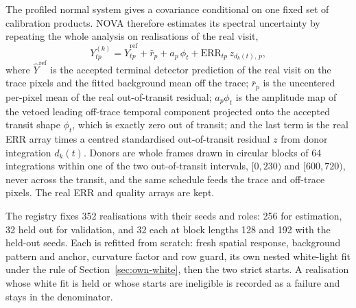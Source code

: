 The profiled normal system gives a covariance conditional on one fixed
set of calibration products. NOVA therefore estimates its spectral
uncertainty by repeating the whole analysis on realisations of the real
visit,
\begin{equation}
 Y^{(k)}_{tp}=\widehat Y^{\mathrm{ref}}_{tp}+\bar r_p+a_p\,\phi_t
 +\mathrm{ERR}_{tp}\,z_{d_k(t),\,p},
 \label{eq:ensemble-draw}
\end{equation}
where $\widehat Y^{\mathrm{ref}}$ is the accepted terminal detector
prediction of the real visit on the trace pixels and the fitted
background mean off the trace; $\bar r_p$ is the uncentered per-pixel
mean of the real out-of-transit residual; $a_p\phi_t$ is the amplitude
map of the vetoed leading off-trace temporal component projected onto
the accepted transit shape $\phi_t$, which is exactly zero out of
transit; and the last term is the real ERR array times a centred
standardised out-of-transit residual $z$ from donor integration
$d_k(t)$. Donors are whole frames drawn in circular blocks of 64
integrations within one of the two out-of-transit intervals, $[0,230)$
and $[600,720)$, never across the transit, and the same schedule feeds
the trace and off-trace pixels. The real ERR and quality arrays are kept.

The registry fixes 352 realisations with their seeds and roles: 256 for
estimation, 32 held out for validation, and 32 each at block lengths 128
and 192 with the held-out seeds. Each is refitted from scratch: fresh
spatial response, background pattern and anchor, curvature factor and
row guard, its own nested white-light fit under the rule of
Section~\ref{sec:own-white}, then the two strict starts. A realisation
whose white fit is held or whose starts are ineligible is recorded as a
failure and stays in the denominator.

